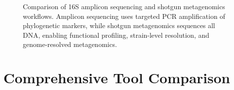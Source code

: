 \begin{figure}[htbp]
\begin{tikzpicture}
\end{tikzpicture}
\caption{Comparison of 16S amplicon sequencing and shotgun metagenomics workflows. Amplicon sequencing uses targeted PCR amplification of phylogenetic markers, while shotgun metagenomics sequences all DNA, enabling functional profiling, strain-level resolution, and genome-resolved metagenomics.}
\label{fig:amplicon_vs_shotgun}
\end{figure}

\section{Comprehensive Tool Comparison}
\label{sec:meta_tool_comparison}

